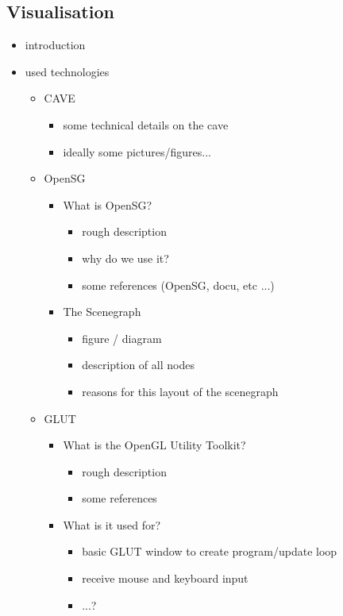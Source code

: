 \documentclass[conference]{acmsiggraph}
\begin{document}
\subsection{Visualisation}
\begin{itemize}
\item introduction
\item{used technologies
	\begin{itemize}
	\item{CAVE
		\begin{itemize}
		\item some technical details on the cave
		\item ideally some pictures/figures...
		\end{itemize}
	}
	\item{OpenSG
		\begin{itemize}
		\item{ What is OpenSG?
			\begin{itemize}
			\item rough description
			\item why do we use it?
			\item some references (OpenSG, docu, etc ...)
			\end{itemize}
		}
		\item{The Scenegraph
			\begin{itemize}
			\item figure / diagram
			\item description of all nodes
			\item reasons for this layout of the scenegraph
			\end{itemize}
		}
		\end{itemize}
	}
	\item{GLUT
		\begin{itemize}
		\item{What is the OpenGL Utility Toolkit?
			\begin{itemize}
			\item rough description
			\item some references
			\end{itemize}
		}
		\item{What is it used for?
			\begin{itemize}
			\item basic GLUT window to create program/update loop
			\item receive mouse and keyboard input
			\item ...?
			\end{itemize}
}
\end{itemize}}
\end{itemize}}
\end{itemize}
\end{document}
